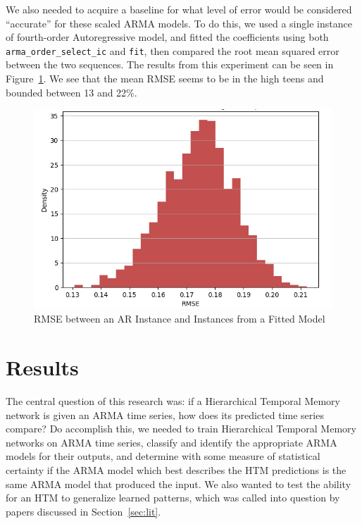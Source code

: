 \documentclass[oneside,12pt,openany]{book}
\begin{document}
    We also needed to acquire a baseline for what level of error would be considered ``accurate'' for these scaled ARMA models. To do this, we used a single instance of fourth-order Autoregressive model, and fitted the coefficients using both \texttt{arma\_order\_select\_ic} and \texttt{fit}, then compared the root mean squared error between the two sequences. The results from this experiment can be seen in Figure~\ref{fig:RMSELag4vsInstances}. We see that the mean RMSE seems to be in the high teens and bounded between 13 and 22\%.
    
    \begin{figure}[hbt!]
        \centering
        \includegraphics[width=.75\linewidth]{images/4LagARvsInstancesFromFittedCoeffs.png}
        \caption{RMSE between an AR Instance and Instances from a Fitted Model}
        \label{fig:RMSELag4vsInstances}
    \end{figure}




	
	
	
	\chapter{Results}

	The central question of this research was: if a Hierarchical Temporal Memory network is given an ARMA time series, how does its predicted time series compare? Do accomplish this, we needed to train Hierarchical Temporal Memory networks on ARMA time series, classify and identify the appropriate ARMA models for their outputs, and determine with some measure of statistical certainty if the ARMA model which best describes the HTM predictions is the same ARMA model that produced the input. We also wanted to test the ability for an HTM to generalize learned patterns, which was called into question by papers discussed in Section~\ref{sec:lit}.
    
\end{document}
